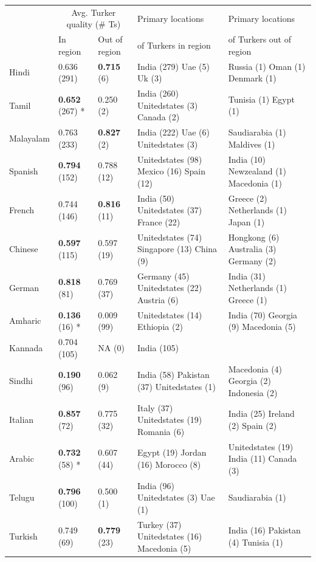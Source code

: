 \documentclass[11pt]{article}
\begin{document}
\begin{table}
\scriptsize
\begin{center}
\begin{tabular}{lllll}
\hline\hline
&\multicolumn{2}{c}{Avg. Turker quality (\# Ts)}&Primary locations&Primary locations\\
&In region&Out of region&of Turkers in region&of Turkers out of region\\
\hline\hline
Hindi & 0.636 (291) & \textbf{0.715} (6) & India (279) Uae (5) Uk (3)  & Russia (1) Oman (1) Denmark (1) \\
Tamil & \textbf{0.652} (267) * & 0.250 (2) & India (260) Unitedstates (3) Canada (2)  & Tunisia (1) Egypt (1)  \\
Malayalam & 0.763 (233) & \textbf{0.827} (2) & India (222) Uae (6) Unitedstates (3)  & Saudiarabia (1) Maldives (1) \\
Spanish & \textbf{0.794} (152) & 0.788 (12) & Unitedstates (98) Mexico (16) Spain (12)  & India (10) Newzealand (1) Macedonia (1)  \\
French & 0.744 (146) & \textbf{0.816} (11) & India (50) Unitedstates (37) France (22)  & Greece (2) Netherlands (1) Japan (1) \\
Chinese & \textbf{0.597} (115) & 0.597 (19) & Unitedstates (74) Singapore (13) China (9)  & Hongkong (6) Australia (3) Germany (2)  \\
German & \textbf{0.818} (81) & 0.769 (37) & Germany (45) Unitedstates (22) Austria (6)  & India (31) Netherlands (1) Greece (1)  \\
Amharic & \textbf{0.136} (16) * & 0.009 (99) & Unitedstates (14) Ethiopia (2)  & India (70) Georgia (9) Macedonia (5)  \\
Kannada & 0.704 (105) & NA (0) & India (105)  & \\
Sindhi & \textbf{0.190} (96) & 0.062 (9) & India (58) Pakistan (37) Unitedstates (1)  & Macedonia (4) Georgia (2) Indonesia (2)  \\
Italian & \textbf{0.857} (72) & 0.775 (32) & Italy (37) Unitedstates (19) Romania (6)  & India (25) Ireland (2) Spain (2)  \\
Arabic & \textbf{0.732} (58) * & 0.607 (44) & Egypt (19) Jordan (16) Morocco (8)  & Unitedstates (19) India (11) Canada (3)  \\
Telugu & \textbf{0.796} (100) & 0.500 (1) & India (96) Unitedstates (3) Uae (1)  & Saudiarabia (1)  \\
Turkish & 0.749 (69) & \textbf{0.779} (23) & Turkey (37) Unitedstates (16) Macedonia (5)  & India (16) Pakistan (4) Tunisia (1) \\

\end{tabular}
\end{center}
\end{table}
\end{document}

